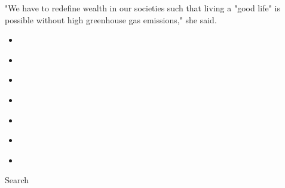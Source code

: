 "We have to redefine wealth in our societies such that living a "good
life" is possible without high greenhouse gas emissions," she said.

\begin{itemize}
\item
\end{itemize}

\begin{itemize}
\item
\end{itemize}

\begin{itemize}
\item
\end{itemize}

\begin{itemize}
\item
\end{itemize}

\begin{itemize}
\item
\end{itemize}

\begin{itemize}
\item
\end{itemize}

\begin{itemize}
\item
\end{itemize}

Search

